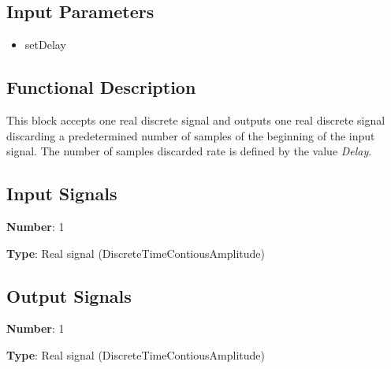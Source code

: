 \documentclass[../../sdf/tex/BPSK_system.tex]{subfiles}
\date{ }
\begin{document}
\onlyinsubfile{\maketitle}

\subsection*{Input Parameters}

\begin{multicols}{2}
	\begin{itemize}
		\item setDelay
	\end{itemize}
\end{multicols}

\subsection*{Functional Description}

This block accepts one real discrete signal and outputs one real discrete signal discarding a predetermined number of samples of the beginning of the input signal. The number of samples discarded rate is defined by the value \textit{Delay}.

\subsection*{Input Signals}

\textbf{Number}: 1

\textbf{Type}: Real signal (DiscreteTimeContiousAmplitude)

\subsection*{Output Signals}

\textbf{Number}: 1

\textbf{Type}: Real signal (DiscreteTimeContiousAmplitude)
\end{document}
